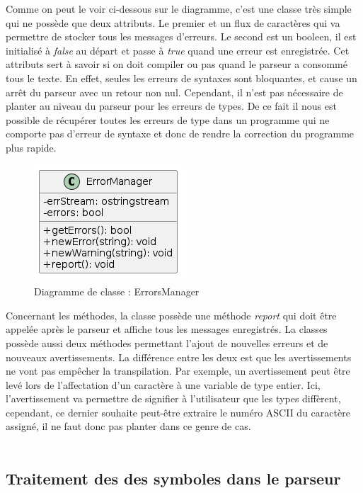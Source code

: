 \documentclass[a4paper]{article}%
\begin{document}
Comme on peut le voir ci-dessous sur le diagramme, c'est une classe très simple
qui ne possède que deux attributs. Le premier et un flux de caractères qui va
permettre de stocker tous les messages d'erreurs. Le second est un booleen, il
est initialisé à \textit{false} au départ et passe à \textit{true} quand une
erreur est enregistrée. Cet attributs sert à savoir si on doit compiler ou pas
quand le parseur a consommé tous le texte. En effet, seules les erreurs de
syntaxes sont bloquantes, et cause un arrêt du parseur avec un retour non nul.
Cependant, il n'est pas nécessaire de planter au niveau du parseur pour les
erreurs de types. De ce fait il nous est possible de récupérer toutes les
erreurs de type dans un programme qui ne comporte pas d'erreur de syntaxe et
donc de rendre la correction du programme plus rapide.

\clearpage
\begin{figure}[h!]
  \begin{center}
  \includegraphics[scale=0.5]{../ressources/diagrams/errMgr.png}
  \caption{Diagramme de classe : ErrorsManager}
  \end{center}
\end{figure}

Concernant les méthodes, la classe possède une méthode \textit{report} qui doit
être appelée après le parseur et affiche tous les messages enregistrés. La
classes possède aussi deux méthodes permettant l'ajout de nouvelles erreurs et
de nouveaux avertissements. La différence entre les deux est que les
avertissements ne vont pas empêcher la transpilation. Par exemple, un
avertissement peut être levé lors de l'affectation d'un caractère à une variable
de type entier. Ici, l'avertissement va permettre de signifier à l'utilisateur
que les types diffèrent, cependant, ce dernier souhaite peut-être extraire le
numéro ASCII du caractère assigné, il ne faut donc pas planter dans ce genre de
cas.\\~\\

\subsection{Traitement des des symboles dans le parseur}
\end{document}
